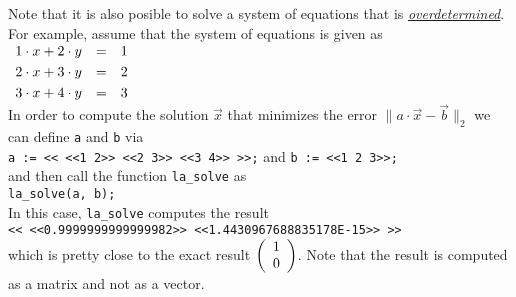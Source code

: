Note that it is also posible to solve a system of equations that is 
\href{http://en.wikipedia.org/wiki/Overdetermined_system}{\emph{overdetermined}}.  For example,
assume that the system of equations is given as
\\[0.2cm]
\hspace*{1.3cm}
$
\begin{array}[c]{lcl}
  1 \cdot x + 2 \cdot y & = & 1 \\[0.1cm]
  2 \cdot x + 3 \cdot y & = & 2 \\[0.1cm]
  3 \cdot x + 4 \cdot y & = & 3 
\end{array}
$
\\[0.2cm]
In order to compute the solution $\vec{x}$ that minimizes the error
 $\|a \cdot \vec{x} - \vec{b}\|_2$ we can 
define \texttt{a} and \texttt{b} via
\\[0.2cm]
\hspace*{1.3cm}
\texttt{a := << <<1 2>> <<2 3>> <<3 4>> >>;} \quad and \quad \texttt{b := <<1 2 3>>;}
\\[0.2cm]
and then call  the function \texttt{la\_solve} as 
\\[0.2cm]
\hspace*{1.3cm}
\texttt{la\_solve(a, b);}
\\[0.2cm]
In this case, \texttt{la\_solve} computes the result
\\[0.2cm]
\hspace*{1.3cm}
\texttt{<< <<0.9999999999999982>> <<1.4430967688835178E-15>> >>}
\\[0.2cm]
which is pretty close to the exact result $\left(\begin{array}[c]{l} 1 \\ 0 \end{array}\right)$.
Note that the result is computed as a matrix and not as a vector.  
\vspace*{0.3cm}

